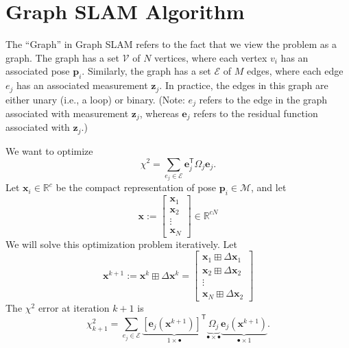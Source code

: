 \documentclass{article}
\newcommand{\transp}{{\scriptstyle{\mathsf{T}}}}
\begin{document}
\section{Graph SLAM Algorithm}

The ``Graph'' in Graph SLAM refers to the fact that we view the problem as a graph.  The graph has a set $\mathcal{V}$ of $N$ vertices, where each vertex $v_i$ has an associated pose $\mathbf{p}_i$.  Similarly, the graph has a set $\mathcal{E}$ of $M$ edges, where each edge $e_j$ has an associated measurement $\mathbf{z}_j$.  In practice, the edges in this graph are either unary (i.e., a loop) or binary.  (Note: $e_j$ refers to the edge in the graph associated with measurement $\mathbf{z}_j$, whereas $\mathbf{e}_j$ refers to the residual function associated with $\mathbf{z}_j$.)

We want to optimize
%
\begin{equation*}
    \chi^2 = \sum_{e_j \in \mathcal{E}} \mathbf{e}_j^\transp \Omega_j \mathbf{e}_j.
\end{equation*}
%
Let $\mathbf{x}_i \in \mathbb{R}^c$ be the compact representation of pose $\mathbf{p}_i \in \mathcal{M}$, and let
%
\begin{equation*}
    \mathbf{x} := \begin{bmatrix} \mathbf{x}_1 \\ \mathbf{x}_2 \\ \vdots \\ \mathbf{x}_N \end{bmatrix} \in \mathbb{R}^{cN}
\end{equation*}
%
We will solve this optimization problem iteratively.  Let
%
\begin{equation}
    \mathbf{x}^{k+1} := \mathbf{x}^k \boxplus \Delta \mathbf{x}^k = \begin{bmatrix} \mathbf{x}_1 \boxplus \Delta \mathbf{x}_1 \\ \mathbf{x}_2 \boxplus \Delta \mathbf{x}_2 \\ \vdots \\ \mathbf{x}_N \boxplus \Delta \mathbf{x}_2 \end{bmatrix} \label{eq:update}
\end{equation}
%
The $\chi^2$ error at iteration $k+1$ is
\begin{equation}
    \chi_{k+1}^2 = \sum_{e_j \in \mathcal{E}} \underbrace{\left[ \mathbf{e}_j(\mathbf{x}^{k+1}) \right]^\transp}_{1 \times \bullet} \underbrace{\Omega_j}_{\bullet \times \bullet} \underbrace{\mathbf{e}_j(\mathbf{x}^{k+1})}_{\bullet \times 1}.  \label{eq:chisq_at_kplusone}
\end{equation}
\end{document}
